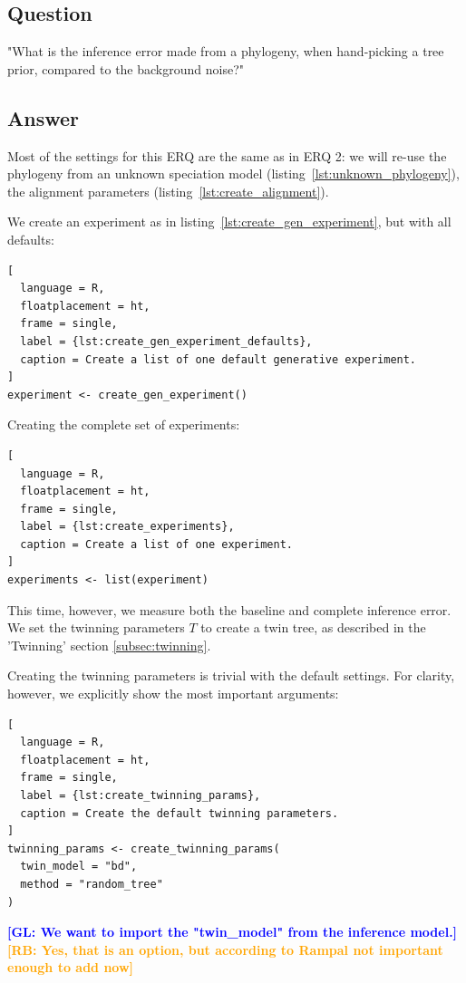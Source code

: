 \documentclass{article}
\newcommand{\giovanni}[1]{\textcolor{blue}{\textbf{[GL: #1]}}}
\newcommand{\richel}[1]{\textcolor{orange}{\textbf{[RB: #1]}}}
\begin{document}
\subsection{Question}

"What is the inference error made from a phylogeny, 
when hand-picking a tree prior, compared to the background noise?"

\subsection{Answer}

Most of the settings for this ERQ are
the same as in ERQ 2: we will re-use the phylogeny from an 
unknown speciation model (listing~\ref{lst:unknown_phylogeny}), 
the alignment parameters (listing~\ref{lst:create_alignment}).

We create an experiment as in 
listing~\ref{lst:create_gen_experiment},
but with all defaults:

\begin{lstlisting}[
  language = R,
  floatplacement = ht,
  frame = single,
  label = {lst:create_gen_experiment_defaults},
  caption = Create a list of one default generative experiment.
]
experiment <- create_gen_experiment()
\end{lstlisting}

Creating the complete set of experiments:

\begin{lstlisting}[
  language = R,
  floatplacement = ht,
  frame = single,
  label = {lst:create_experiments},
  caption = Create a list of one experiment.
]
experiments <- list(experiment)
\end{lstlisting}

This time, however, we measure both the baseline and complete inference error.
We set the twinning parameters $\mathit{T}$ to create a twin tree,
as described in the 'Twinning' section \ref{subsec:twinning}.

Creating the twinning parameters is trivial with the default settings.
For clarity, however, we explicitly show the most
important arguments:

\begin{lstlisting}[
  language = R,
  floatplacement = ht,
  frame = single,
  label = {lst:create_twinning_params},
  caption = Create the default twinning parameters.
]
twinning_params <- create_twinning_params(
  twin_model = "bd", 
  method = "random_tree"
)
\end{lstlisting}
\giovanni{We want to import the "twin\_model" from the inference model.}
\richel{Yes, that is an option, but according to Rampal not important enough
to add now}
\end{document}
